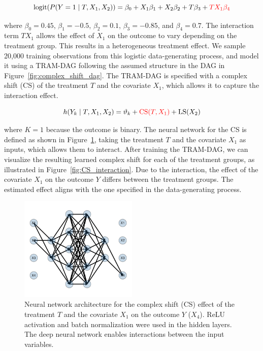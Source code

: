 \[
\text{logit}(P(Y=1 \mid T, X_1, X_2)) = \beta_0 + X_1 \beta_1 + X_2 \beta_2 + T \beta_3 + \textcolor{red}{T X_1\beta_4}
\]

where $\beta_0 = 0.45$, $\beta_1 = -0.5$, $\beta_2 = 0.1$, $\beta_3 = -0.85$, and $\beta_4 = 0.7$. The interaction term $T X_1$ allows the effect of $X_1$ on the outcome to vary depending on the treatment group. This results in a heterogeneous treatment effect. 
We sample 20,000 training observations from this logistic data-generating process, and model it using a TRAM-DAG following the assumed structure in the DAG in Figure~\ref{fig:complex_shift_dag}. The TRAM-DAG is specified with a complex shift (CS) of the treatment $T$ and the covariate $X_1$, which allows it to capture the interaction effect.

\[
h(Y_k \mid T, X_1, X_2) = \vartheta_k + \textcolor{red}{\text{CS}(T, X_1)} + \text{LS}(X_2)
\]

where $K = 1$ because the outcome is binary. The neural network for the CS is defined as shown in Figure~\ref{fig:complex_shift_nn}, taking the treatment $T$ and the covariate $X_1$ as inputs, which allows them to interact. 
After training the TRAM-DAG, we can visualize the resulting learned complex shift for each of the treatment groups, as illustrated in Figure~\ref{fig:CS_interaction}. Due to the interaction, the effect of the covariate $X_1$ on the outcome $Y$ differs between the treatment groups. The estimated effect aligns with the one specified in the data-generating process.


\begin{figure}[htbp]
\centering
\includegraphics[width=0.5\textwidth]{img/appendix_CS_NN_interaction.pdf}
\caption{Neural network architecture for the complex shift (CS) effect of the treatment $T$ and the covariate $X_1$ on the outcome $Y$ ($X_4$). ReLU activation and batch normalization were used in the hidden layers. The deep neural network enables interactions between the input variables.}
\label{fig:complex_shift_nn}
\end{figure}


